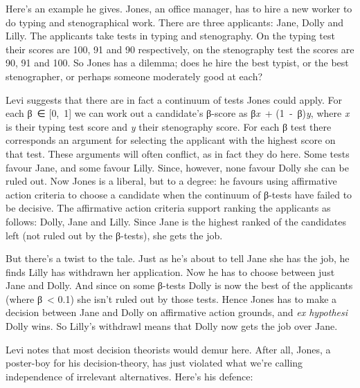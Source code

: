 \documentclass[
  11pt,
  letterpaper,
  DIV=11,
  numbers=noendperiod,
  twoside]{scrartcl}
\begin{document}
Here's an example he gives. Jones, an office manager, has to hire a new
worker to do typing and stenographical work. There are three applicants:
Jane, Dolly and Lilly. The applicants take tests in typing and
stenography. On the typing test their scores are 100, 91 and 90
respectively, on the stenography test the scores are 90, 91 and 100. So
Jones has a dilemma; does he hire the best typist, or the best
stenographer, or perhaps someone moderately good at each?

Levi suggests that there are in fact a continuum of tests Jones could
apply. For each β~∈ {[}0,~1{]} we can work out a candidate's β-score as
β\emph{x}~+ (1~‑~β)\emph{y}, where \emph{x} is their typing test score
and \emph{y} their stenography score. For each β test there corresponds
an argument for selecting the applicant with the highest score on that
test. These arguments will often conflict, as in fact they do here. Some
tests favour Jane, and some favour Lilly. Since, however, none favour
Dolly she can be ruled out. Now Jones is a liberal, but to a degree: he
favours using affirmative action criteria to choose a candidate when the
continuum of β-tests have failed to be decisive. The affirmative action
criteria support ranking the applicants as follows: Dolly, Jane and
Lilly. Since Jane is the highest ranked of the candidates left (not
ruled out by the β-tests), she gets the job.

But there's a twist to the tale. Just as he's about to tell Jane she has
the job, he finds Lilly has withdrawn her application. Now he has to
choose between just Jane and Dolly. And since on some β-tests Dolly is
now the best of the applicants (where β~\textless{} 0.1) she isn't ruled
out by those tests. Hence Jones has to make a decision between Jane and
Dolly on affirmative action grounds, and \emph{ex hypothesi} Dolly wins.
So Lilly's withdrawl means that Dolly now gets the job over Jane.

Levi notes that most decision theorists would demur here. After all,
Jones, a poster-boy for his decision-theory, has just violated what
we're calling independence of irrelevant alternatives. Here's his
defence:
\end{document}
